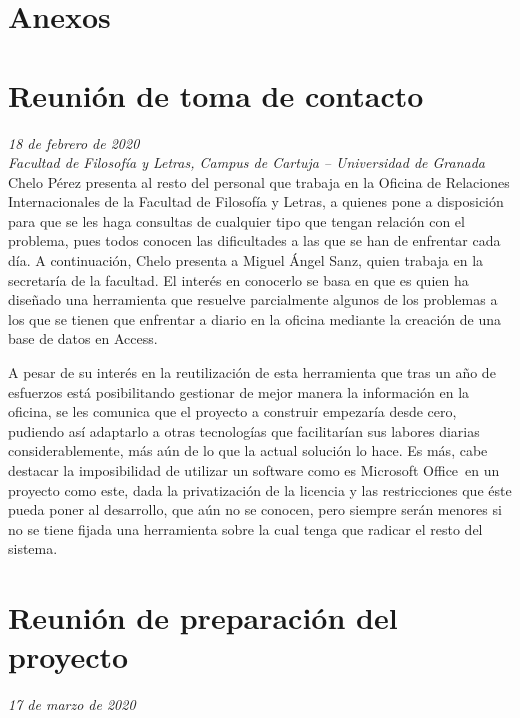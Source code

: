 \section*{Anexos}
\leavevmode
\begin{appendices}
	\section{Reunión de toma de contacto}
		\textit{18 de febrero de 2020}\\

		\textit{Facultad de Filosofía y Letras, Campus de Cartuja -- Universidad de Granada}\\
		
		Chelo Pérez presenta al resto del personal que trabaja en la Oficina de Relaciones Internacionales de la Facultad de Filosofía y Letras, a quienes pone a disposición para que se les haga consultas de cualquier tipo que tengan relación con el problema, pues todos conocen las dificultades a las que se han de enfrentar cada día. A continuación, Chelo presenta a Miguel Ángel Sanz, quien trabaja en la secretaría de la facultad. El interés en conocerlo se basa en que es quien ha diseñado una herramienta que resuelve parcialmente algunos de los problemas a los que se tienen que enfrentar a diario en la oficina mediante la creación de una base de datos en Access\textregistered.
		
		A pesar de su interés en la reutilización de esta herramienta que tras un año de esfuerzos está posibilitando gestionar de mejor manera la información en la oficina, se les comunica que el proyecto a construir empezaría desde cero, pudiendo así adaptarlo a otras tecnologías que facilitarían sus labores diarias considerablemente, más aún de lo que la actual solución lo hace. Es más, cabe destacar la imposibilidad de utilizar un software como es Microsoft Office\textregistered \ en un proyecto como este, dada la privatización de la licencia y las restricciones que éste pueda poner al desarrollo, que aún no se conocen, pero siempre serán menores si no se tiene fijada una herramienta sobre la cual tenga que radicar el resto del sistema.
		
		\section{Reunión de preparación del proyecto}
		
		\textit{17 de marzo de 2020}\\
		

\end{appendices}
